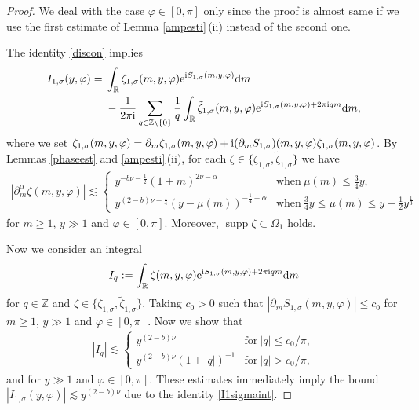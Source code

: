 \documentclass[10pt,a4paper]{amsart}
\numberwithin{equation}{section}
\def\R{\mathbb{R}}%
\DeclareMathOperator{\supp}{supp}%
\def\a{\alpha}
\def\f{\varphi}
\def\m{\mu}
\def\n{\nu}
\def\s{\sigma}
\def\z{\zeta}
\def\pa{\partial}
\begin{document}
\begin{proof}
We deal with the case $\f\in [0,\pi]$ only since the proof is almost same if we use the first estimate of Lemma \ref{ampesti}\,(ii) instead of the second one.

The identity \eqref{discon} implies
\begin{align}
I_{1,\s}(y,\f)={}&\int_{\R}\z_{1,\s}(m,y,\f){\rm e}^{{\rm i}S_{1,\s}(m,y,\f)}{\rm d}m\nonumber\\
&-\frac{1}{2\pi {\rm i}}\sum_{q\in\mathbb{Z}\setminus \{0\}}\frac{1}{q}\int_{\R}\tilde{\z}_{1,\s}(m,y,\f){\rm e}^{{\rm i}S_{1,\s}(m,y,\f)+2\pi {\rm i}qm}{\rm d}m,\label{I1sigmaint}
\end{align}
where we set
$
\tilde{\z}_{1,\s}(m,y,\f)=\pa_m\z_{1,\s}(m,y,\f)+{\rm i}(\pa_mS_{1,\s})(m,y,\f)\z_{1,\s}(m,y,\f)$.
By Lemmas \ref{phaseest} and \ref{ampesti}\,(ii), for each $\z\in \big\{\z_{1,\s},\tilde{\z}_{1,\s}\big\}$ we have
\begin{align}\label{sevzetaest}
|\pa_{m}^{\a}\z(m,y,\f)|\lesssim \begin{cases} y^{-b\n-\frac{1}{2}}(1+m)^{2\n-\a} & \text{when}\  \m(m)\leq \frac{3}{4}y, \\
y^{(2-b)\n-\frac{1}{4}} (y-\m(m))^{-\frac{1}{4}-\a}& \text{when}\  \frac{3}{4}y\leq \m(m)\leq y-\frac{1}{2}y^{\frac{1}{3}}
\end{cases}
\end{align}
for $m\geq 1$, $y\gg1$ and $\f\in [0,\pi]$. Moreover, $\supp \z\subset \Omega_1$ holds.

Now we consider an integral
\[%
I_q:=\int_{\R}\z(m,y,\f){\rm e}^{{\rm i}S_{1,\s}(m,y,\f)+2\pi {\rm i}qm}{\rm d}m
\]
for $q\in\mathbb{Z}$ and $\z\in \{\z_{1,\s},\tilde{\z}_{1,\s}\}$. Taking $c_0>0$ such that $|\pa_mS_{1,\s}(m,y,\f)|\leq c_0$ for $m\geq 1$, $y\gg 1$ and $\f\in [0,\pi]$. Now we show that
\begin{align*}%
|I_q|\lesssim \begin{cases}
y^{(2-b)\n} & \text{for}\  |q|\leq c_0/\pi,\\
y^{(2-b)\n}(1+|q|)^{-1}& \text{for}\  |q|> c_0/\pi,
\end{cases}
\end{align*}
and for $y\gg 1$ and $\f\in [0,\pi]$.
These estimates immediately imply the bound $|I_{1,\s}(y,\f)|\lesssim y^{(2-b)\n}$ due to the identity \eqref{I1sigmaint}.


\end{proof}
\end{document}

